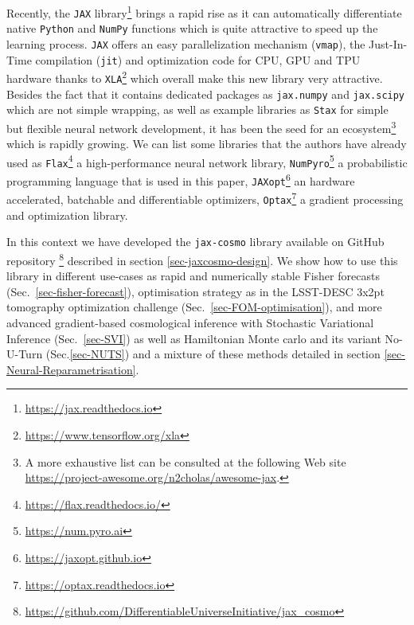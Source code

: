\documentclass[final,5p,times,twocolumn,authoryear]{elsarticle}
\newcommand{\github}{\href{https://github.com/DifferentiableUniverseInitiative/jax\_cosmo}{\faGithub}}
\newcommand{\numpyro}{\texttt{NumPyro}}
\begin{document}
Recently, the \texttt{JAX} library\footnote{\url{https://jax.readthedocs.io}} \citep{jax2018github} brings a rapid rise as it can automatically differentiate native \texttt{Python} and \texttt{NumPy} functions which is quite attractive to speed up the learning process. \texttt{JAX} offers an easy parallelization mechanism (\texttt{vmap}), the Just-In-Time compilation (\texttt{jit}) and optimization code for CPU, GPU and TPU hardware thanks to \texttt{XLA}\footnote{\url{https://www.tensorflow.org/xla}} which overall make this new library very attractive. Besides the fact that it contains dedicated packages as \texttt{jax.numpy} and \texttt{jax.scipy} which are not simple wrapping, as well as example libraries as \texttt{Stax} for simple but flexible neural network development, it has been the seed for an ecosystem\footnote{A more exhaustive list can be consulted at the following Web site \url{https://project-awesome.org/n2cholas/awesome-jax}.} which is rapidly growing. We can list some libraries that the authors have already used as \texttt{Flax}\footnote{\url{https://flax.readthedocs.io/}} \citep{flax2020github} a high-performance neural network library, \numpyro\footnote{\url{https://num.pyro.ai}} \citep{phan2019composable,bingham2019pyro} a probabilistic programming language that is used in this paper, \texttt{JAXopt}\footnote{\url{https://jaxopt.github.io}} \citep{jaxopt_implicit_diff} an hardware accelerated, batchable and differentiable optimizers, \texttt{Optax}\footnote{\url{https://optax.readthedocs.io}} \citep{optax2020github} a gradient processing and optimization library.

In this context we have developed the \texttt{jax-cosmo} library available on GitHub repository \github\footnote{ \url{https://github.com/DifferentiableUniverseInitiative/jax_cosmo}} described in section \ref{sec-jaxcosmo-design}. We show how to use this library in different use-cases as rapid and numerically stable Fisher forecasts (Sec.~\ref{sec-fisher-forecast}), optimisation strategy as in the LSST-DESC 3x2pt tomography optimization challenge \citep{2021OJAp....4E..13Z} (Sec.~\ref{sec-FOM-optimisation}), and more advanced gradient-based cosmological inference with Stochastic Variational Inference (Sec.~\ref{sec-SVI}) as well as Hamiltonian Monte carlo and its variant No-U-Turn (Sec.\ref{sec-NUTS}) and a mixture of these methods detailed in section \ref{sec-Neural-Reparametrisation}.

\end{document}
